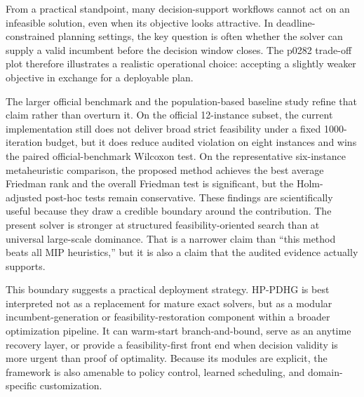 From a practical standpoint, many decision-support workflows cannot act on an infeasible solution, even when its objective looks attractive. In deadline-constrained planning settings, the key question is often whether the solver can supply a valid incumbent before the decision window closes. The p0282 trade-off plot therefore illustrates a realistic operational choice: accepting a slightly weaker objective in exchange for a deployable plan.

The larger official benchmark and the population-based baseline study refine that claim rather than overturn it. On the official 12-instance subset, the current implementation still does not deliver broad strict feasibility under a fixed 1000-iteration budget, but it does reduce audited violation on eight instances and wins the paired official-benchmark Wilcoxon test. On the representative six-instance metaheuristic comparison, the proposed method achieves the best average Friedman rank and the overall Friedman test is significant, but the Holm-adjusted post-hoc tests remain conservative. These findings are scientifically useful because they draw a credible boundary around the contribution. The present solver is stronger at structured feasibility-oriented search than at universal large-scale dominance. That is a narrower claim than ``this method beats all MIP heuristics,'' but it is also a claim that the audited evidence actually supports.

This boundary suggests a practical deployment strategy. HP-PDHG is best interpreted not as a replacement for mature exact solvers, but as a modular incumbent-generation or feasibility-restoration component within a broader optimization pipeline. It can warm-start branch-and-bound, serve as an anytime recovery layer, or provide a feasibility-first front end when decision validity is more urgent than proof of optimality. Because its modules are explicit, the framework is also amenable to policy control, learned scheduling, and domain-specific customization.
